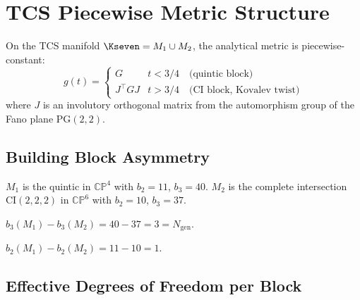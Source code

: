 
\chapter{TCS Piecewise Metric Structure}\label{chap:tcs_piecewise}

On the TCS manifold $\Kseven = M_1 \cup M_2$, the analytical metric is
piecewise-constant:
\[
    g(t) = \begin{cases}
        G & t < 3/4 \quad\text{(quintic block)} \\
        J^\top G J & t > 3/4 \quad\text{(CI block, Kovalev twist)}
    \end{cases}
\]
where $J$ is an involutory orthogonal matrix from the automorphism group
of the Fano plane $\mathrm{PG}(2,2)$.

\section{Building Block Asymmetry}

\begin{definition}\label{def:building_blocks}
    \leanok
    $M_1$ is the quintic in $\mathbb{CP}^4$ with $b_2 = 11$, $b_3 = 40$.
    $M_2$ is the complete intersection $\mathrm{CI}(2,2,2)$ in $\mathbb{CP}^6$
    with $b_2 = 10$, $b_3 = 37$.
\end{definition}

\begin{theorem}\label{thm:b3_asymmetry}
    \leanok
    $b_3(M_1) - b_3(M_2) = 40 - 37 = 3 = N_{\mathrm{gen}}$.
\end{theorem}

\begin{theorem}[$b_2$ asymmetry]\label{thm:b2_asymmetry}
    \leanok
    $b_2(M_1) - b_2(M_2) = 11 - 10 = 1$.
\end{theorem}

\section{Effective Degrees of Freedom per Block}

